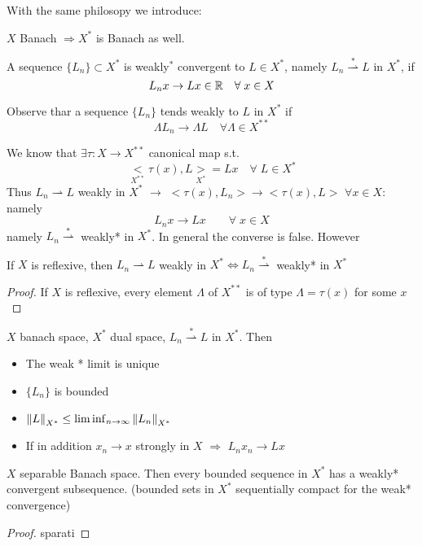 With the same philosopy we introduce: 
\begin{definition}
    \(X \) Banach \(\Rightarrow X^* \) is Banach as well.
\end{definition}
\begin{definition}
    A sequence \(\{L_n \} \subset X^*\) is weakly\(^*\) convergent to \(L \in  X^*\), namely \(L_n \overset{*}{\rightharpoonup} L\) in \(X^*\), if 
    \[
        L_n x \to Lx \in \mathbb{R} \quad \forall\; x \in X
    \]
\end{definition}
\begin{remark}
    Observe thar a sequence \(\{L_n\} \) tends weakly to \(L\) in \(X^*\) if 
    \[
        \Lambda L_n \to \Lambda L \quad \forall \Lambda \in X^{**}
    \]
\end{remark}
We know that \(\exists \tau:X \to X^{**}\) canonical map s.t. 
    \[
        \underset{X^{**}}{<}\tau(x), L \underset{X^*}{>} = Lx \quad \forall \; L \in X^*
    \]
    Thus \(L_n \rightharpoonup L\) weakly in \(X^*\) \(\rightarrow\) \(<\tau(x), L_n> \to <\tau(x), L>\) \(\forall x \in X:\) namely
    \[
        L_n x \to Lx \qquad \forall \; x \in X
    \]
    namely \(L_n \overset{*}{\rightharpoonup}\) weakly* in \(X^*\). In general the converse is false. However
    \begin{proposition}
        If \(X\) is reflexive, then \(L_n \rightharpoonup L\) weakly in \(X^* \iff L_n \overset{*}{\rightharpoonup}\) weakly* in \(X^*\)
    \end{proposition}
    \begin{proof}
        If \(X\) is reflexive, every element \(\Lambda\) of \(X^{**}\) is of type \(\Lambda = \tau(x)\) for some \(x\)
    \end{proof}
    \begin{proposition}
        \(X\) banach space, \(X^*\) dual space, \(L_n \overset{*}{\rightharpoonup} L\) in \(X^*\). Then
        \begin{itemize}
            \item The weak * limit is unique
            \item \(\{L_n\}\) is bounded
            \item \(\norm{L}_{X^*} \leq \liminf _{n \to \infty} \norm{L_n}_{X^*}\)
            \item If in addition \(x_n \to x\) strongly in \(X\) \(\Rightarrow\) \(L_nx_n \to Lx\) 
        \end{itemize}
    \end{proposition}

    \begin{theorem}
        \(X \) separable Banach space. Then every bounded sequence in \(X^*\) has a weakly* convergent subsequence. (bounded sets in \(X^* \) sequentially compact for the weak* convergence)
    \end{theorem}

    \begin{proof}
        sparati
    \end{proof}

